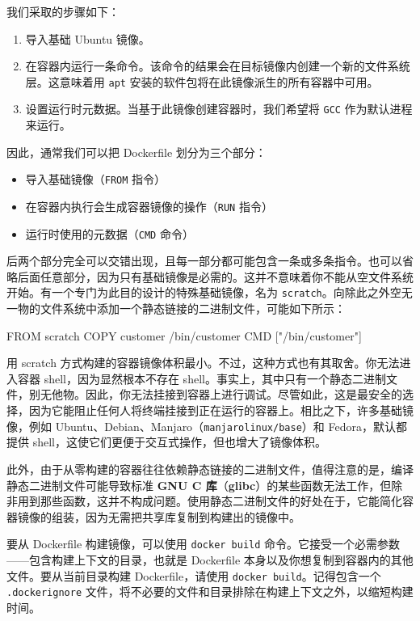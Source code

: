 我们采取的步骤如下：

\begin{enumerate}
\item 导入基础 Ubuntu 镜像。
\item 在容器内运行一条命令。该命令的结果会在目标镜像内创建一个新的文件系统层。这意味着用 \texttt{apt} 安装的软件包将在此镜像派生的所有容器中可用。
\item 设置运行时元数据。当基于此镜像创建容器时，我们希望将 \texttt{GCC} 作为默认进程来运行。
\end{enumerate}

因此，通常我们可以把 Dockerfile 划分为三个部分：

\begin{itemize}
\item 导入基础镜像（\texttt{FROM} 指令）
\item 在容器内执行会生成容器镜像的操作（\texttt{RUN} 指令）
\item 运行时使用的元数据（\texttt{CMD} 命令）
\end{itemize}

\label{idx:1749}
\label{idx:1750}
后两个部分完全可以交错出现，且每一部分都可能包含一条或多条指令。也可以省略后面任意部分，因为只有基础镜像是必需的。这并不意味着你不能从空文件系统开始。有一个专门为此目的设计的特殊基础镜像，名为 \texttt{scratch}。向除此之外空无一物的文件系统中添加一个静态链接的二进制文件，可能如下所示：

\begin{codebox}[docker]
FROM scratch
COPY customer /bin/customer
CMD ["/bin/customer"]
\end{codebox}

用 scratch 方式构建的容器镜像体积最小。不过，这种方式也有其取舍。你无法进入容器 shell，因为显然根本不存在 shell。事实上，其中只有一个静态二进制文件，别无他物。因此，你无法挂接到容器上进行调试。尽管如此，这是最安全的选择，因为它能阻止任何人将终端挂接到正在运行的容器上。相比之下，许多基础镜像，例如 Ubuntu、Debian、Manjaro（\texttt{manjarolinux/\allowbreak{}base}）和 Fedora，默认都提供 shell，这使它们更便于交互式操作，但也增大了镜像体积。

\label{idx:1751}
此外，由于从零构建的容器往往依赖静态链接的二进制文件，值得注意的是，编译静态二进制文件可能导致标准 \textbf{GNU C 库}（\textbf{glibc}）的某些函数无法工作，但除非用到那些函数，这并不构成问题。使用静态二进制文件的好处在于，它能简化容器镜像的组装，因为无需把共享库复制到构建出的镜像中。

要从 Dockerfile 构建镜像，可以使用 \texttt{docker build} 命令。它接受一个必需参数——包含构建上下文的目录，也就是 Dockerfile 本身以及你想复制到容器内的其他文件。要从当前目录构建 Dockerfile，请使用 \texttt{docker build}。记得包含一个 \texttt{.\allowbreak{}dockerignore} 文件，将不必要的文件和目录排除在构建上下文之外，以缩短构建时间。


